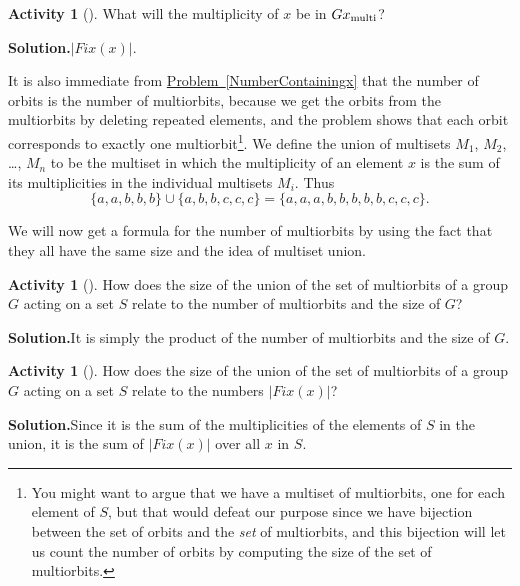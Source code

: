 \documentclass[10pt,]{book}
\theoremstyle{plain}
\theoremstyle{definition}
\newtheorem{activity}[project]{Activity}
\numberwithin{equation}{chapter}
\begin{document}
\begin{activity}[]\label{activity-305}
What will the multiplicity of \(x\) be in \(Gx_{\mbox{\scriptsize multi} }\)?%
\par\medskip\noindent%
\textbf{Solution.}\quad \(|{ Fix}(x)|\).%
\end{activity}
It is also immediate from \hyperref[NumberContainingx]{Problem~\ref{NumberContainingx}} that the number of orbits is the number of multiorbits, because we get the orbits from the multiorbits by deleting repeated elements, and the problem shows that each orbit corresponds to exactly one multiorbit\footnote{You might want to argue that we have a multiset of multiorbits, one for each element of \(S\), but that would defeat our purpose since we have  bijection between the set of orbits and the \emph{set} of multiorbits, and this bijection will let us count the number of orbits by computing the size of the set of multiorbits.\label{fn-22}}. We define the union of multisets \(M_1\), \(M_2\), \dots{}, \(M_n\) to be the multiset in which the multiplicity of an element \(x\) is the sum of its multiplicities in the individual multisets \(M_i\). Thus%
\begin{equation*}
\{a,a,b,b,b\}\cup \{a,b,b,c,c,c\}=\{a,a,a,b,b,b,b,b,c,c,c\}.
\end{equation*}
%
\par
We will now get a formula for the number of multiorbits by using the fact that they all have the same size and the idea of multiset union.%
\begin{activity}[]\label{numbermultiorbits1}
How does the size of the union of the set of multiorbits of a group \(G\) acting on a set \(S\) relate to the number of multiorbits and the size of \(G\)?%
\par\medskip\noindent%
\textbf{Solution.}\quad It is simply the product of the number of multiorbits and the size of \(G\).%
\end{activity}
\begin{activity}[]\label{numbermultiorbits2}
How does the size of the union of the set of multiorbits of a group \(G\) acting on a set \(S\) relate to the numbers \(|{
Fix}(x)|\)?%
\par\medskip\noindent%
\textbf{Solution.}\quad Since it is the sum of the multiplicities of the elements of \(S\) in the union, it is the sum of \(|{ Fix}(x)|\) over all \(x\) in \(S\).%
\end{activity}
\end{document}
